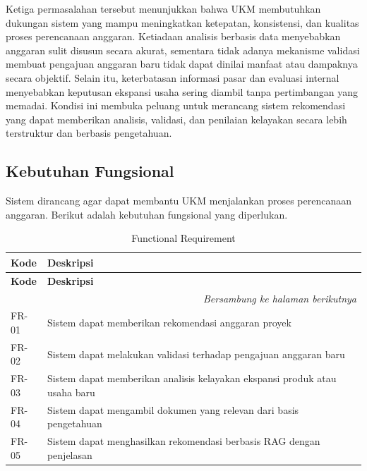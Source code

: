 Ketiga permasalahan tersebut menunjukkan bahwa UKM membutuhkan dukungan sistem yang mampu meningkatkan ketepatan, konsistensi, dan kualitas proses perencanaan anggaran. Ketiadaan analisis berbasis data menyebabkan anggaran sulit disusun secara akurat, sementara tidak adanya mekanisme validasi membuat pengajuan anggaran baru tidak dapat dinilai manfaat atau dampaknya secara objektif. Selain itu, keterbatasan informasi pasar dan evaluasi internal menyebabkan keputusan ekspansi usaha sering diambil tanpa pertimbangan yang memadai. Kondisi ini membuka peluang untuk merancang sistem rekomendasi yang dapat memberikan analisis, validasi, dan penilaian kelayakan secara lebih terstruktur dan berbasis pengetahuan. 

\subsection{Kebutuhan Fungsional}
Sistem dirancang agar dapat membantu UKM menjalankan proses perencanaan anggaran. Berikut adalah kebutuhan fungsional yang diperlukan.

\begin{longtable}{|p{3cm}|p{5cm}|p{7cm}|}
\caption{Functional Requirement}
\label{tbl:Functional Req} \\
\hline
\textbf{Kode} &  \textbf{Deskripsi} \\
\hline
\endfirsthead

\hline
\textbf{Kode} &  \textbf{Deskripsi} \\
\hline
\endhead

\hline
\multicolumn{3}{r}{\textit{Bersambung ke halaman berikutnya}} \\
\endfoot

\hline
\endlastfoot

FR-01
&
Sistem dapat memberikan rekomendasi anggaran proyek
\\ \hline

FR-02
&
Sistem dapat melakukan validasi terhadap pengajuan anggaran baru
\\ \hline

FR-03
&
Sistem dapat memberikan analisis kelayakan ekspansi produk atau usaha baru
\\ \hline

FR-04
&
Sistem dapat mengambil dokumen yang relevan dari basis pengetahuan
\\ \hline

FR-05
&
Sistem dapat menghasilkan rekomendasi berbasis RAG dengan penjelasan
\\ \hline

\end{longtable}

